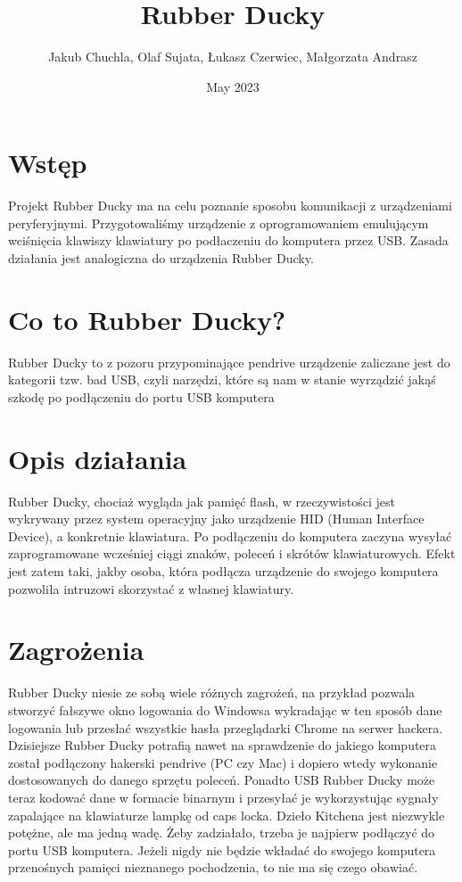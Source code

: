 \documentclass{article}
\title{Rubber Ducky}
\author{Jakub Chuchla, Olaf Sujata, Łukasz Czerwiec, Małgorzata Andrasz}
\date{May 2023}
\begin{document}
\maketitle

\section{Wstęp}
Projekt Rubber Ducky ma na celu poznanie sposobu komunikacji z urządzeniami peryferyjnymi. Przygotowaliśmy urządzenie z oprogramowaniem emulującym wciśnięcia klawiszy klawiatury po podłaczeniu do komputera przez USB. Zasada działania jest analogiczna do urządzenia Rubber Ducky. 

\section{Co to Rubber Ducky?}

Rubber Ducky to z pozoru przypominające pendrive urządzenie zaliczane jest do kategorii tzw. bad USB, czyli narzędzi, które są nam w stanie wyrządzić jakąś szkodę po podłączeniu do portu USB komputera

\section{Opis działania}
Rubber Ducky, chociaż wygląda jak pamięć flash, w rzeczywistości jest wykrywany przez system operacyjny jako urządzenie HID (Human Interface Device), a konkretnie klawiatura. Po podłączeniu do komputera zaczyna wysyłać zaprogramowane wcześniej ciągi znaków, poleceń i skrótów klawiaturowych. Efekt jest zatem taki, jakby osoba, która podłącza urządzenie do swojego komputera pozwoliła intruzowi skorzystać z własnej klawiatury.

\section{Zagrożenia}
Rubber Ducky niesie ze sobą wiele różnych zagrożeń, na przykład pozwala stworzyć fałszywe okno logowania do Windowsa wykradając w ten sposób dane logowania lub przesłać wszystkie hasła przeglądarki Chrome na serwer hackera. Dzisiejsze Rubber Ducky potrafią nawet na sprawdzenie do jakiego komputera został podłączony hakerski pendrive (PC czy Mac) i dopiero wtedy wykonanie dostosowanych do danego sprzętu poleceń. Ponadto USB Rubber Ducky może teraz kodować dane w formacie binarnym i przesyłać je wykorzystując sygnały zapalające na klawiaturze lampkę od caps locka. Dzieło Kitchena jest niezwykle potężne, ale ma jedną wadę. Żeby zadziałało, trzeba je najpierw podłączyć do portu USB komputera. Jeżeli nigdy nie będzie wkładać do swojego komputera przenośnych pamięci nieznanego pochodzenia, to nie ma się czego obawiać.
\end{document}
